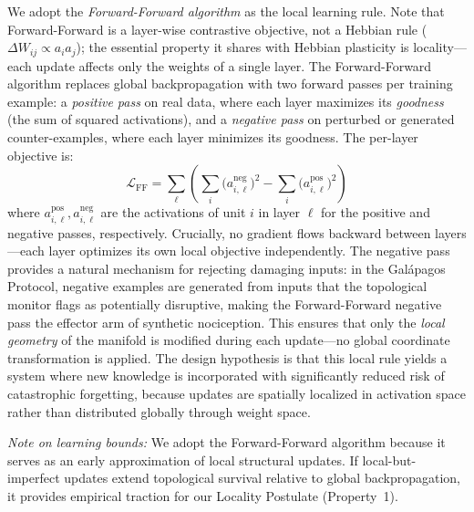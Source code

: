 \documentclass{article}
\begin{document}
We adopt the \emph{Forward-Forward algorithm} \citep{Hinton2022forwardforward} as the local learning rule. Note that Forward-Forward is a layer-wise contrastive objective, not a Hebbian rule ($\Delta W_{ij} \propto a_i a_j$); the essential property it shares with Hebbian plasticity is locality---each update affects only the weights of a single layer. The Forward-Forward algorithm replaces global backpropagation with two forward passes per training example: a \emph{positive pass} on real data, where each layer maximizes its \emph{goodness} (the sum of squared activations), and a \emph{negative pass} on perturbed or generated counter-examples, where each layer minimizes its goodness. The per-layer objective is:
\begin{equation}
\mathcal{L}_{\text{FF}} = \sum_{\ell} \left( \sum_i \bigl(a_{i,\ell}^{\text{neg}}\bigr)^2 - \sum_i \bigl(a_{i,\ell}^{\text{pos}}\bigr)^2 \right)
\end{equation}
where $a_{i,\ell}^{\text{pos}}, a_{i,\ell}^{\text{neg}}$ are the activations of unit $i$ in layer $\ell$ for the positive and negative passes, respectively. Crucially, no gradient flows backward between layers---each layer optimizes its own local objective independently. The negative pass provides a natural mechanism for rejecting damaging inputs: in the Gal\'apagos Protocol, negative examples are generated from inputs that the topological monitor flags as potentially disruptive, making the Forward-Forward negative pass the effector arm of synthetic nociception. This ensures that only the \emph{local geometry} of the manifold is modified during each update---no global coordinate transformation is applied. The design hypothesis is that this local rule yields a system where new knowledge is incorporated with significantly reduced risk of catastrophic forgetting, because updates are spatially localized in activation space rather than distributed globally through weight space.

\emph{Note on learning bounds:} We adopt the Forward-Forward algorithm because it serves as an early approximation of local structural updates. If local-but-imperfect updates extend topological survival relative to global backpropagation, it provides empirical traction for our Locality Postulate (Property~1).
\end{document}
